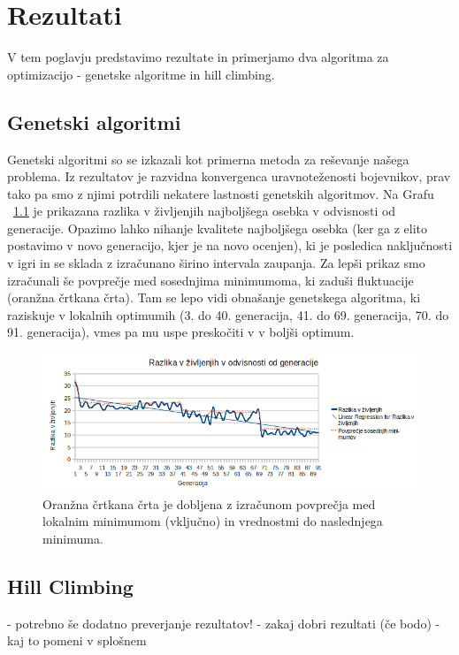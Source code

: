 \documentclass[12pt,a4paper,openany]{book}
\begin{document}
\chapter{Rezultati}
V tem poglavju predstavimo rezultate in primerjamo dva algoritma za optimizacijo - genetske algoritme in hill climbing.

\section{Genetski algoritmi}
Genetski algoritmi so se izkazali kot primerna metoda za reševanje našega problema. Iz rezultatov je razvidna konvergenca uravnoteženosti bojevnikov, prav tako pa smo z njimi potrdili nekatere lastnosti genetskih algoritmov. Na Grafu ~\ref{fig:genetskiLifeDiff} je prikazana razlika v življenjih najboljšega osebka v odvisnosti od generacije. Opazimo lahko nihanje kvalitete najboljšega osebka (ker ga z elito postavimo v novo generacijo, kjer je na novo ocenjen), ki je posledica naključnosti v igri in se sklada z izračunano širino intervala zaupanja. Za lepši prikaz smo izračunali še povprečje med sosednjima minimumoma, ki zaduši fluktuacije (oranžna črtkana črta). Tam se lepo vidi obnašanje genetskega algoritma, ki raziskuje v lokalnih optimumih (3. do 40. generacija, 41. do 69. generacija, 70. do 91. generacija), vmes pa mu uspe preskočiti v v boljši optimum.

\begin{figure}[ht]
 \centering
 \includegraphics[width=15cm]{genetskiLifeDiff.png}
 \caption[Graf razlike v življenjih v odvisnosti od generacije]{Oranžna črtkana črta je dobljena z izračunom povprečja med lokalnim minimumom (vključno) in vrednostmi do naslednjega minimuma.}
 \label{fig:genetskiLifeDiff}
\end{figure}



\section{Hill Climbing}
- potrebno še dodatno preverjanje rezultatov!
- zakaj dobri rezultati (če bodo)
- kaj to pomeni v splošnem
\end{document}
